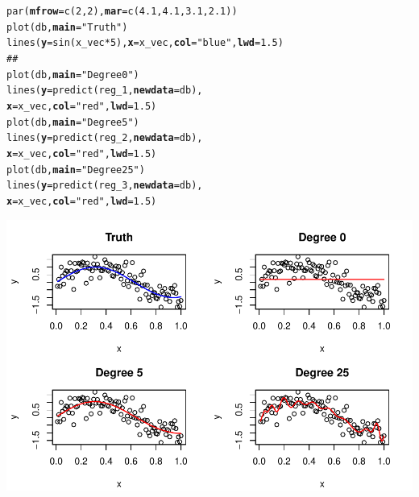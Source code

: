 \documentclass[14pt]{extreport}\usepackage[]{graphicx}\usepackage[]{xcolor}
\makeatletter
\def\maxwidth{ %
  \ifdim\Gin@nat@width>\linewidth
    \linewidth
  \else
    \Gin@nat@width
  \fi
}
\newcommand{\hlnum}[1]{\textcolor[rgb]{0.69,0.494,0}{#1}}%
\newcommand{\hlstr}[1]{\textcolor[rgb]{0.749,0.012,0.012}{#1}}%
\newcommand{\hlcom}[1]{\textcolor[rgb]{0.514,0.506,0.514}{\textit{#1}}}%
\newcommand{\hlopt}[1]{\textcolor[rgb]{0,0,0}{#1}}%
\newcommand{\hlstd}[1]{\textcolor[rgb]{0,0,0}{#1}}%
\newcommand{\hlkwc}[1]{\textcolor[rgb]{0,0,0}{\textbf{#1}}}%
\newcommand{\hlkwd}[1]{\textcolor[rgb]{0.004,0.004,0.506}{#1}}%
\newenvironment{kframe}{%
 \def\at@end@of@kframe{}%
 \ifinner\ifhmode%
  \def\at@end@of@kframe{\end{minipage}}%
  \begin{minipage}{\columnwidth}%
 \fi\fi%
 \def\FrameCommand##1{\hskip\@totalleftmargin \hskip-\fboxsep
 \colorbox{shadecolor}{##1}\hskip-\fboxsep
     \hskip-\linewidth \hskip-\@totalleftmargin \hskip\columnwidth}%
 \MakeFramed {\advance\hsize-\width
   \@totalleftmargin\z@ \linewidth\hsize
   \@setminipage}}%
 {\par\unskip\endMakeFramed%
 \at@end@of@kframe}
\newenvironment{knitrout}{}{} %
\makeatother
\begin{document}
\begin{knitrout}
\color{fgcolor}\begin{kframe}
\begin{alltt}
\hlkwd{par}\hlstd{(}\hlkwc{mfrow}\hlstd{=}\hlkwd{c}\hlstd{(}\hlnum{2}\hlstd{,}\hlnum{2}\hlstd{),} \hlkwc{mar}\hlstd{=}\hlkwd{c}\hlstd{(}\hlnum{4.1}\hlstd{,}\hlnum{4.1}\hlstd{,}\hlnum{3.1}\hlstd{,}\hlnum{2.1}\hlstd{))}
\hlkwd{plot}\hlstd{(db,} \hlkwc{main}\hlstd{=}\hlstr{"Truth"}\hlstd{)}
\hlkwd{lines}\hlstd{(}\hlkwc{y}\hlstd{=}\hlkwd{sin}\hlstd{(x_vec} \hlopt{*} \hlnum{5}\hlstd{),} \hlkwc{x}\hlstd{=x_vec,} \hlkwc{col}\hlstd{=}\hlstr{"blue"}\hlstd{,} \hlkwc{lwd}\hlstd{=}\hlnum{1.5}\hlstd{)}
\hlcom{##}
\hlkwd{plot}\hlstd{(db,} \hlkwc{main}\hlstd{=}\hlstr{"Degree 0"}\hlstd{)}
\hlkwd{lines}\hlstd{(}\hlkwc{y} \hlstd{=} \hlkwd{predict}\hlstd{(reg_1,} \hlkwc{newdata} \hlstd{= db),}
      \hlkwc{x} \hlstd{= x_vec,} \hlkwc{col}\hlstd{=}\hlstr{"red"}\hlstd{,} \hlkwc{lwd}\hlstd{=}\hlnum{1.5}\hlstd{)}
\hlkwd{plot}\hlstd{(db,} \hlkwc{main}\hlstd{=}\hlstr{"Degree 5"}\hlstd{)}
\hlkwd{lines}\hlstd{(}\hlkwc{y} \hlstd{=} \hlkwd{predict}\hlstd{(reg_2,} \hlkwc{newdata} \hlstd{= db),}
      \hlkwc{x} \hlstd{= x_vec,} \hlkwc{col}\hlstd{=}\hlstr{"red"}\hlstd{,} \hlkwc{lwd}\hlstd{=}\hlnum{1.5}\hlstd{)}
\hlkwd{plot}\hlstd{(db,} \hlkwc{main}\hlstd{=}\hlstr{"Degree 25"}\hlstd{)}
\hlkwd{lines}\hlstd{(}\hlkwc{y} \hlstd{=} \hlkwd{predict}\hlstd{(reg_3,} \hlkwc{newdata} \hlstd{= db),}
      \hlkwc{x} \hlstd{= x_vec,} \hlkwc{col}\hlstd{=}\hlstr{"red"}\hlstd{,} \hlkwc{lwd}\hlstd{=}\hlnum{1.5}\hlstd{)}
\end{alltt}
\end{kframe}

{\centering \includegraphics[width=\maxwidth]{figure/unnamed-chunk-4-1} 

}


\end{knitrout}
\end{document}
